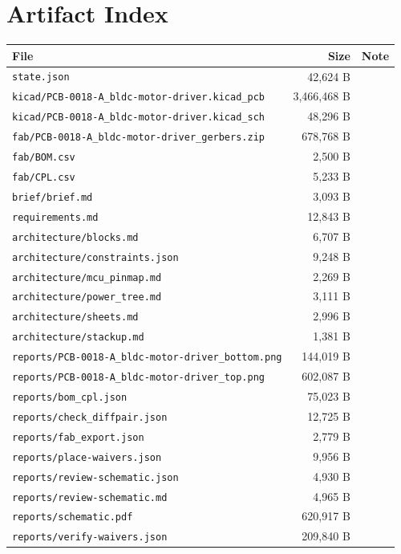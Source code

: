 \documentclass[11pt,a4paper]{article}
\begin{document}
\section{Artifact Index}
{\small
\begin{longtable}{p{9cm}rp{4cm}}
\toprule
\textbf{File} & \textbf{Size} & \textbf{Note} \\
\midrule
\endhead
\texttt{state.json} & 42,624 B &  \\
\texttt{kicad/PCB-0018-A\_bldc-motor-driver.kicad\_pcb} & 3,466,468 B &  \\
\texttt{kicad/PCB-0018-A\_bldc-motor-driver.kicad\_sch} & 48,296 B &  \\
\texttt{fab/PCB-0018-A\_bldc-motor-driver\_gerbers.zip} & 678,768 B &  \\
\texttt{fab/BOM.csv} & 2,500 B &  \\
\texttt{fab/CPL.csv} & 5,233 B &  \\
\texttt{brief/brief.md} & 3,093 B &  \\
\texttt{requirements.md} & 12,843 B &  \\
\texttt{architecture/blocks.md} & 6,707 B &  \\
\texttt{architecture/constraints.json} & 9,248 B &  \\
\texttt{architecture/mcu\_pinmap.md} & 2,269 B &  \\
\texttt{architecture/power\_tree.md} & 3,111 B &  \\
\texttt{architecture/sheets.md} & 2,996 B &  \\
\texttt{architecture/stackup.md} & 1,381 B &  \\
\texttt{reports/PCB-0018-A\_bldc-motor-driver\_bottom.png} & 144,019 B &  \\
\texttt{reports/PCB-0018-A\_bldc-motor-driver\_top.png} & 602,087 B &  \\
\texttt{reports/bom\_cpl.json} & 75,023 B &  \\
\texttt{reports/check\_diffpair.json} & 12,725 B &  \\
\texttt{reports/fab\_export.json} & 2,779 B &  \\
\texttt{reports/place-waivers.json} & 9,956 B &  \\
\texttt{reports/review-schematic.json} & 4,930 B &  \\
\texttt{reports/review-schematic.md} & 4,965 B &  \\
\texttt{reports/schematic.pdf} & 620,917 B &  \\
\texttt{reports/verify-waivers.json} & 209,840 B &  \\
\bottomrule
\end{longtable}
}
\end{document}
